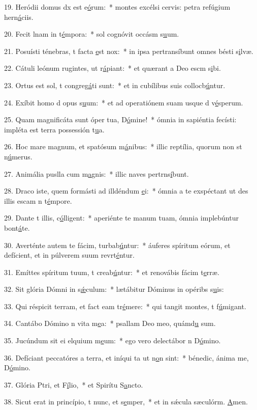 19. Heródii domus dx est e\uline{ó}rum:~* montes excélsi cervis: petra refúgium hern\uline{á}ciis.\par 
20. Fecit lnam in t\uline{é}mpora:~* sol cognóvit occásm s\uline{u}um.\par 
21. Posuísti ténebras, t facta \uline{e}st nox:~* in ipsa pertransíbunt omnes bésti s\uline{i}lvæ.\par 
22. Cátuli leónum rugintes, ut r\uline{á}piant:~* et quærant a Deo escm s\uline{i}bi.\par 
23. Ortus est sol, t congreg\uline{á}ti sunt:~* et in cubílibus suis collocb\uline{ú}ntur.\par 
24. Exíbit homo d opus s\uline{u}um:~* et ad operatiónem suam usque d v\uline{é}sperum.\par 
25. Quam magnificáta sunt óper tua, D\uline{ó}mine!~* ómnia in sapiéntia fecísti: impléta est terra possessión t\uline{u}a.\par 
26. Hoc mare magnum, et spatósum m\uline{á}nibus:~* illic reptília, quorum non st n\uline{ú}merus.\par 
27. Animália puslla cum m\uline{a}gnis:~* illic naves pertrns\uline{í}bunt.\par 
28. Draco iste, quem formásti ad illdéndum \uline{e}i:~* ómnia a te exspéctant ut des illis escam n t\uline{é}mpore.\par 
29. Dante t illis, c\uline{ó}lligent:~* aperiénte te manum tuam, ómnia implebúntur bont\uline{á}te.\par 
30. Averténte autem te fácim, turbab\uline{ú}ntur:~* áuferes spíritum eórum, et defícient, et in púlverem suum revrt\uline{é}ntur.\par 
31. Emíttes spíritum tuum, t creab\uline{ú}ntur:~* et renovábis fácim t\uline{e}rræ.\par 
32. Sit glória Dómni in s\uline{ǽ}culum:~* lætábitur Dóminus in opéribs s\uline{u}is:\par 
33. Qui réspicit terram, et fact eam tr\uline{é}mere:~* qui tangit montes, t f\uline{ú}migant.\par 
34. Cantábo Dómino n vita m\uline{e}a:~* psallam Deo meo, quámd\uline{u} sum.\par 
35. Jucúndum sit ei elquium m\uline{e}um:~* ego vero delectábor n D\uline{ó}mino.\par 
36. Defíciant peccatóres a terra, et iníqui ta ut n\uline{o}n sint:~* bénedic, ánima me, D\uline{ó}mino.\par 
37. Glória Ptri, et F\uline{í}lio,~* et Spirítu S\uline{a}ncto.\par 
38. Sicut erat in princípio, t nunc, et s\uline{e}mper,~* et in sǽcula sæculórm. \uline{A}men.\par 
